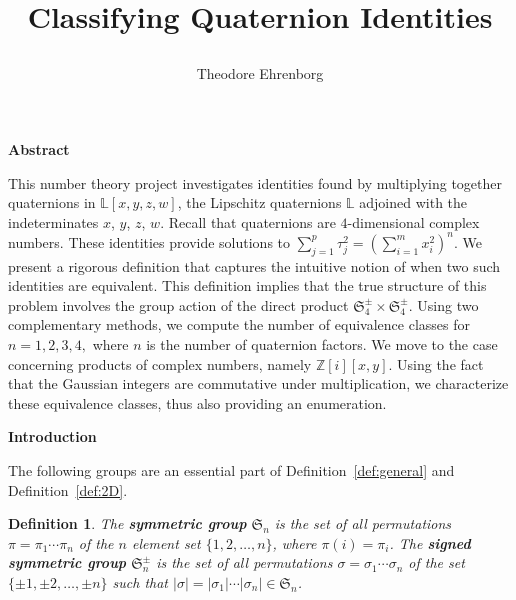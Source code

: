 \documentclass[12pt]{article}
\newtheorem{definition}[theorem]{Definition}
\numberwithin{equation}{section}
\newcommand{\MySpacing}{25}
\newcommand{\MyFontSize}{20}
\newcommand{\MySectionSpacing}{15}
\newcommand{\MySectionFontSize}{40}
\begin{document}
\begin{landscape}

\bf
{
\title
{
\fontsize{120}{150}\selectfont%
\begin{center}
\textbf { Classifying Quaternion Identities }
\end{center}
}
}
\author{
\fontsize{50}{50}\selectfont
\sc Theodore Ehrenborg}
\date{}
\maketitle

\newpage

{\fontsize{\MyFontSize}{\MySpacing}\selectfont%
{


\noindent
\begin{center}
{\fontsize{\MySectionFontSize}{\MySectionSpacing}\selectfont \textbf
 {Abstract}
}
\end{center}

\fontsize{\MyFontSize}{\MySpacing}\selectfont

This number theory project investigates identities found by
multiplying together quaternions in \( \mathbb{L}[x,y,z,w] \), the
Lipschitz quaternions \( \mathbb{L} \) adjoined with the
indeterminates \(x\), \(y\), \(z\), \(w\).  Recall that quaternions
are \(4\)-dimensional complex numbers.  These identities provide
solutions to \( \sum_{j = 1}^{p} \tau_j ^ 2 = \left( \sum_{i = 1}^{m}
x_i ^ 2 \right) ^ n \). We present a rigorous definition that captures
the intuitive notion of when two such identities are equivalent. This
definition implies that the true structure of this problem involves the
group action of the direct product \( \mathfrak{S}_4^\pm \times \mathfrak{S}_4^\pm \).  Using
two complementary methods, we compute the number of equivalence
classes for \(n = 1, 2, 3, 4,\) where \(n\) is the number of
quaternion factors. We move to the case concerning products of complex
numbers, namely \( \mathbb{Z}[i][x,y] \). Using the fact that the
Gaussian integers are commutative under multiplication, we
characterize these equivalence classes, thus also providing an
enumeration.

\newpage

\noindent
\begin{center}
{\fontsize{\MySectionFontSize}{\MySectionSpacing}\selectfont \textbf
 {Introduction}
}
\end{center}


The following groups are an essential part of Definition~\ref{def:general}
and Definition~\ref{def:2D}.
\begin{definition}
The {\bf symmetric group} \( \mathfrak{S}_n \) is the 
set of all permutations \( \pi = \pi_1 \cdots \pi_n \) 
of the \( n \) element set \( \{ 1, 2, \ldots, n \} \),
where \( \pi(i) = \pi_i \).
The {\bf signed symmetric group} \( \mathfrak{S}_n^\pm \)
is the set of all permutations \( \sigma = \sigma_1 \cdots \sigma_n\)
of the set \( \{ \pm 1, \pm 2, \ldots, \pm n \} \) such that
\( | \sigma | = | \sigma_1 | \cdots |\sigma_n| \in \mathfrak{S}_n \).
\end{definition}

}}
\end{landscape}
\end{document}
